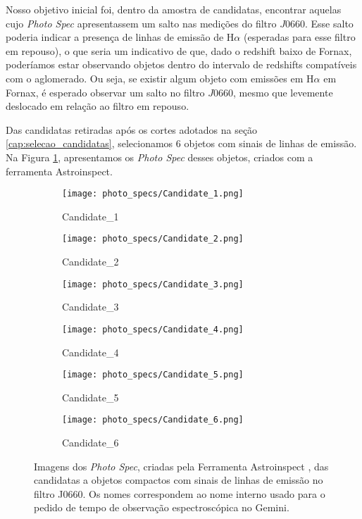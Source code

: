 Nosso objetivo inicial foi, dentro da amostra de candidatas, encontrar aquelas cujo \textit{Photo Spec} apresentassem um salto nas medições do filtro $J0660$. Esse salto poderia indicar a presença de linhas de emissão de H$\alpha$ (esperadas para esse filtro em repouso), o que seria um indicativo de que, dado o redshift baixo de Fornax, poderíamos estar observando objetos dentro do intervalo de redshifts compatíveis com o aglomerado. Ou seja, se existir algum objeto com emissões em H$\alpha$ em Fornax, é esperado observar um salto no filtro $J0660$, mesmo que levemente deslocado em relação ao filtro em repouso.

Das candidatas retiradas após os cortes adotados na seção \ref{cap:selecao_candidatas}, selecionamos 6 objetos com sinais de linhas de emissão. Na Figura \ref{photo_spec_candidatas}, apresentamos os \textit{Photo Spec} desses objetos, criados com a ferramenta Astroinspect.

\begin{figure}[!ht]
    \centering
    \captionsetup{justification=centering}
    \begin{subfigure}[b]{0.3\textwidth}
        \texttt{[image: photo\_specs/Candidate\_1.png]}
        \caption{Candidate\_1}
    \end{subfigure}
    \begin{subfigure}[b]{0.3\textwidth}
        \texttt{[image: photo\_specs/Candidate\_2.png]}
        \caption{Candidate\_2}
    \end{subfigure}
    \begin{subfigure}[b]{0.3\textwidth}
        \texttt{[image: photo\_specs/Candidate\_3.png]}
        \caption{Candidate\_3}
    \end{subfigure}
    \begin{subfigure}[b]{0.3\textwidth}
        \texttt{[image: photo\_specs/Candidate\_4.png]}
        \caption{Candidate\_4}
    \end{subfigure}
    \begin{subfigure}[b]{0.3\textwidth}
        \texttt{[image: photo\_specs/Candidate\_5.png]}
        \caption{Candidate\_5}
    \end{subfigure}
    \begin{subfigure}[b]{0.3\textwidth}
        \texttt{[image: photo\_specs/Candidate\_6.png]}
        \caption{Candidate\_6}
    \end{subfigure}
    \caption{Imagens dos \textit{Photo Spec}, criadas pela Ferramenta Astroinspect \cite{astroinspect}, das candidatas a objetos compactos com sinais de linhas de emissão no filtro J0660. Os nomes correspondem ao nome interno usado para o pedido de tempo de observação espectroscópica no Gemini.}
    \label{photo_spec_candidatas}
\end{figure}

